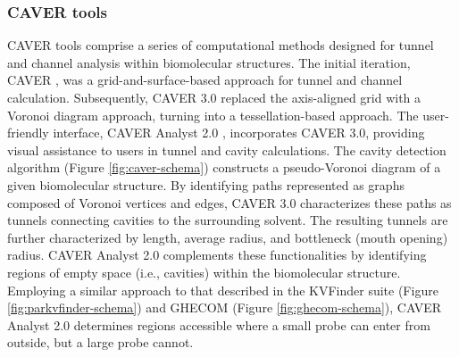 \documentclass[Ingles]{phdthesis}
\def\ie{i.e.\onedot}
\begin{document}
\subsubsection{CAVER tools}

CAVER tools comprise a series of computational methods designed for tunnel and channel analysis within biomolecular structures. The initial iteration, CAVER \cite{caver}, was a grid-and-surface-based approach for tunnel and channel calculation. Subsequently, CAVER 3.0 \cite{caver3} replaced the axis-aligned grid with a Voronoi diagram approach, turning into a tessellation-based approach. The user-friendly interface, CAVER Analyst 2.0 \cite{caveranalyst2}, incorporates CAVER 3.0, providing visual assistance to users in tunnel and cavity calculations. The cavity detection algorithm (Figure \ref{fig:caver-schema}) constructs a pseudo-Voronoi diagram of a given biomolecular structure. By identifying paths represented as graphs composed of Voronoi vertices and edges, CAVER 3.0 characterizes these paths as tunnels connecting cavities to the surrounding solvent. The resulting tunnels are further characterized by length, average radius, and bottleneck (mouth opening) radius. CAVER Analyst 2.0 complements these functionalities by identifying regions of empty space (\ie, cavities) within the biomolecular structure. Employing a similar approach to that described in the KVFinder suite (Figure \ref{fig:parkvfinder-schema}) and \acs{GHECOM} (Figure \ref{fig:ghecom-schema}), CAVER Analyst 2.0 determines regions accessible where a small probe can enter from outside, but a large probe cannot.
\end{document}
